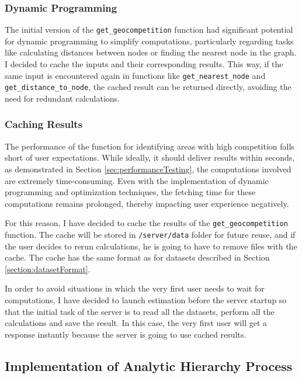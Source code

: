 \subsubsection{Dynamic Programming}
\label{subsec:dynamicProgramming}

The initial version of the \texttt{get\_geocompetition} function had significant potential for dynamic programming to simplify computations, particularly regarding tasks like calculating distances between nodes or finding the nearest node in the graph. I decided to cache the inputs and their corresponding results. This way, if the same input is encountered again in functions like \texttt{get\_nearest\_node} and \texttt{get\_distance\_to\_node}, the cached result can be returned directly, avoiding the need for redundant calculations.

\subsubsection{Caching Results}
\label{subsec:caching}

The performance of the function for identifying areas with high competition falls short of user expectations. While ideally, it should deliver results within seconds, as demonstrated in Section \ref{sec:performanceTesting}, the computations involved are extremely time-consuming. Even with the implementation of dynamic programming and optimization techniques, the fetching time for these computations remains prolonged, thereby impacting user experience negatively.

For this reason, I have decided to cache the results of the \texttt{get\_geocompetition} function. The cache will be stored in \texttt{/server/data} folder for future reuse, and if the user decides to rerun calculations, he is going to have to remove files with the cache. The cache has the same format as for datasets described in Section \ref{section:datasetFormat}.

In order to avoid situations in which the very first user needs to wait for computations, I have decided to launch estimation before the server startup so that the initial task of the server is to read all the datasets, perform all the calculations and save the result. In this case, the very first user will get a response instantly because the server is going to use cached results.

\subsection{Implementation of Analytic Hierarchy Process}

